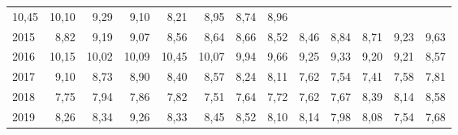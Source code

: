 \begin{tabular}{lllllllllllll}
  \multicolumn{1}{r}{10,45} &
  \multicolumn{1}{r}{10,10} &
  \multicolumn{1}{r}{9,29} &
  \multicolumn{1}{r}{9,10} &
  \multicolumn{1}{r}{8,21} &
  \multicolumn{1}{r}{8,95} &
  \multicolumn{1}{r}{8,74} &
  \multicolumn{1}{r}{8,96} \\
\multicolumn{1}{l}{\hspace{1em}2015} &
  \multicolumn{1}{|r}{8,82} &
  \multicolumn{1}{r}{9,19} &
  \multicolumn{1}{r}{9,07} &
  \multicolumn{1}{r}{8,56} &
  \multicolumn{1}{r}{8,64} &
  \multicolumn{1}{r}{8,66} &
  \multicolumn{1}{r}{8,52} &
  \multicolumn{1}{r}{8,46} &
  \multicolumn{1}{r}{8,84} &
  \multicolumn{1}{r}{8,71} &
  \multicolumn{1}{r}{9,23} &
  \multicolumn{1}{r}{9,63} \\
\multicolumn{1}{l}{\hspace{1em}2016} &
  \multicolumn{1}{|r}{10,15} &
  \multicolumn{1}{r}{10,02} &
  \multicolumn{1}{r}{10,09} &
  \multicolumn{1}{r}{10,45} &
  \multicolumn{1}{r}{10,07} &
  \multicolumn{1}{r}{9,94} &
  \multicolumn{1}{r}{9,66} &
  \multicolumn{1}{r}{9,25} &
  \multicolumn{1}{r}{9,33} &
  \multicolumn{1}{r}{9,20} &
  \multicolumn{1}{r}{9,21} &
  \multicolumn{1}{r}{8,57} \\
\multicolumn{1}{l}{\hspace{1em}2017} &
  \multicolumn{1}{|r}{9,10} &
  \multicolumn{1}{r}{8,73} &
  \multicolumn{1}{r}{8,90} &
  \multicolumn{1}{r}{8,40} &
  \multicolumn{1}{r}{8,57} &
  \multicolumn{1}{r}{8,24} &
  \multicolumn{1}{r}{8,11} &
  \multicolumn{1}{r}{7,62} &
  \multicolumn{1}{r}{7,54} &
  \multicolumn{1}{r}{7,41} &
  \multicolumn{1}{r}{7,58} &
  \multicolumn{1}{r}{7,81} \\
\multicolumn{1}{l}{\hspace{1em}2018} &
  \multicolumn{1}{|r}{7,75} &
  \multicolumn{1}{r}{7,94} &
  \multicolumn{1}{r}{7,86} &
  \multicolumn{1}{r}{7,82} &
  \multicolumn{1}{r}{7,51} &
  \multicolumn{1}{r}{7,64} &
  \multicolumn{1}{r}{7,72} &
  \multicolumn{1}{r}{7,62} &
  \multicolumn{1}{r}{7,67} &
  \multicolumn{1}{r}{8,39} &
  \multicolumn{1}{r}{8,14} &
  \multicolumn{1}{r}{8,58} \\
\multicolumn{1}{l}{\hspace{1em}2019} &
  \multicolumn{1}{|r}{8,26} &
  \multicolumn{1}{r}{8,34} &
  \multicolumn{1}{r}{9,26} &
  \multicolumn{1}{r}{8,33} &
  \multicolumn{1}{r}{8,45} &
  \multicolumn{1}{r}{8,52} &
  \multicolumn{1}{r}{8,10} &
  \multicolumn{1}{r}{8,14} &
  \multicolumn{1}{r}{7,98} &
  \multicolumn{1}{r}{8,08} &
  \multicolumn{1}{r}{7,54} &
  \multicolumn{1}{r}{7,68} \\

\end{tabular}
